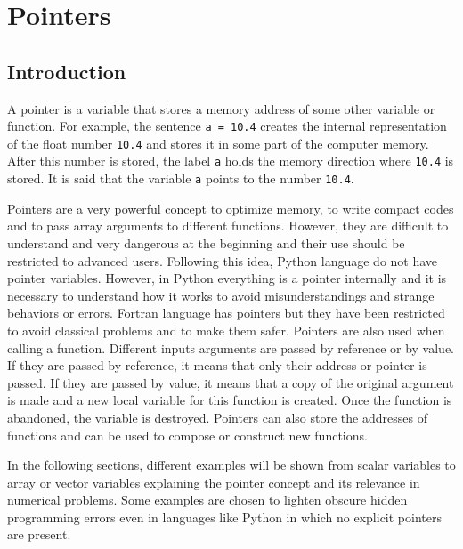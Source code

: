 
 
\chapter{Pointers} 

\vspace{-1cm}
\section{Introduction}
\vspace{-0.2cm}
A pointer is a variable that stores a memory address of some other variable or function. 
For example, the sentence \verb|a = 10.4| creates the internal representation of the float 
 number \verb|10.4| and stores it in some part of the computer memory. After this number is stored, 
the label \verb|a| holds the memory direction where \verb|10.4| is stored. 
It is said that the variable \verb|a| points to the number \verb|10.4|.

Pointers are a very powerful concept to optimize memory, to write compact codes and to pass
array arguments to different functions. However, they are difficult to understand 
and very dangerous at the beginning and their use should be restricted to advanced users. 
Following this idea, Python language do not have pointer variables.
However, in Python everything is a pointer internally and 
it is necessary to understand how it works to avoid  misunderstandings and 
strange behaviors or errors.
Fortran language has pointers but they  have been restricted to  avoid
classical problems and to make them safer.
Pointers are also used when calling a function. Different inputs arguments are passed by reference or by value. 
If they are passed by reference, it means that only their address or pointer is passed. 
If they are passed by value, it means that a copy of the original argument is made
and a new local variable for this function is created. 
Once the function is abandoned, the variable is destroyed.  
Pointers can  also store the addresses of functions 
and can be used to compose or construct new functions. 

In the following sections, 
different examples will be shown from scalar variables to array or vector variables 
explaining the pointer concept and its relevance in numerical problems.
Some examples are chosen to lighten obscure hidden programming errors  even 
in languages like Python in which no explicit pointers are present. 



